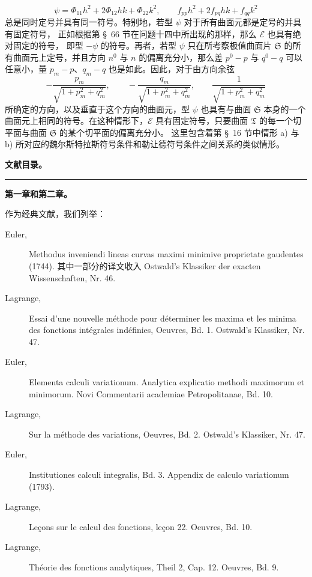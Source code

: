 \documentclass[11pt,a4paper,leqno]{article}
\begin{document}
\[
\psi=\Phi_{11}h^2+2\Phi_{12}hk+\Phi_{22}k^2,\qquad
f_{pp}h^2+2f_{pq}hk+f_{qq}k^2
\]
总是同时定号并具有同一符号。特别地，若型 $\psi$ 对于所有曲面元都是定号的并具有固定符号，
正如根据第 \S~66 节在问题十四中所出现的那样，那么 $\mathcal{E}$ 也具有绝对固定的符号，
即型 $-\psi$ 的符号。再者，若型 $\psi$ 只在所考察极值曲面片 $\mathfrak{S}$
的所有曲面元上定号，并且方向 $n^0$ 与 $n$ 的偏离充分小，那么差 $p^0-p$ 与
$q^0-q$ 可以任意小，量 $p_m-p$、$q_m-q$ 也是如此。因此，对于由方向余弦
\[
-\frac{p_m}{\sqrt{1+p_m^2+q_m^2}},\qquad
-\frac{q_m}{\sqrt{1+p_m^2+q_m^2}},\qquad
\frac{1}{\sqrt{1+p_m^2+q_m^2}}
\]
所确定的方向，以及垂直于这个方向的曲面元，型 $\psi$ 也具有与曲面 $\mathfrak{S}$
本身的一个曲面元上相同的符号。在这种情形下，$\mathcal{E}$ 具有固定符号，只要曲面
$\mathfrak{T}$ 的每一个切平面与曲面 $\mathfrak{S}$ 的某个切平面的偏离充分小。
这里包含着第 \S~16 节中情形 a) 与 b) 所对应的魏尔斯特拉斯符号条件和勒让德符号条件之间关系的类似情形。

\begin{center}
{\Large\bfseries 文献目录。}

\rule{2.4cm}{0.4pt}

{\large\bfseries 第一章和第二章。}
\end{center}

\noindent 作为经典文献，我们列举：

\begin{description}
\item[Euler,] Methodus inveniendi lineas curvas maximi minimive proprietate
gaudentes (1744). 其中一部分的译文收入 Ostwald's Klassiker der exacten
Wissenschaften, Nr. 46.

\item[Lagrange,] Essai d'une nouvelle méthode pour déterminer les maxima et les
minima des fonctions intégrales indéfinies, Oeuvres, Bd. 1. Ostwald's
Klassiker, Nr. 47.

\item[Euler,] Elementa calculi variationum. Analytica explicatio methodi
maximorum et minimorum. Novi Commentarii academiae Petropolitanae, Bd. 10.

\item[Lagrange,] Sur la méthode des variations, Oeuvres, Bd. 2. Ostwald's
Klassiker, Nr. 47.

\item[Euler,] Institutiones calculi integralis, Bd. 3. Appendix de calculo
variationum (1793).

\item[Lagrange,] Leçons sur le calcul des fonctions, leçon 22. Oeuvres, Bd. 10.

\item[Lagrange,] Théorie des fonctions analytiques, Theil 2, Cap. 12. Oeuvres,
Bd. 9.
\end{description}
\end{document}
